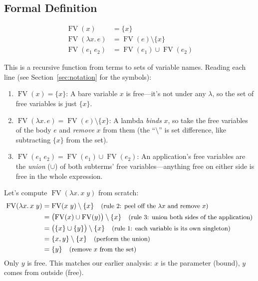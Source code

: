 \documentclass[11pt,a4paper]{article}
\theoremstyle{definition}
\newcommand{\lam}{\lambda}
\newcommand{\FV}{\operatorname{FV}}
\newcommand{\rmark}[1]{\quad\text{\small(#1)}}
\begin{document}
\subsection{Formal Definition}

\begin{defnbox}
\vspace{-0.8em}
\begin{align*}
\FV(x)           &= \{x\} \\
\FV(\lam x.\, e) &= \FV(e) \setminus \{x\} \\
\FV(e_1\; e_2)   &= \FV(e_1) \cup \FV(e_2)
\end{align*}
\end{defnbox}

\begin{intuition}
This is a recursive function from terms to sets of variable names. Reading each
line (see Section~\ref{sec:notation} for the symbols):
\begin{enumerate}[leftmargin=2em]
\item $\FV(x) = \{x\}$: A bare variable $x$ is free---it's not under any
  $\lam$, so the set of free variables is just $\{x\}$.
\item $\FV(\lam x.\, e) = \FV(e) \setminus \{x\}$: A lambda \emph{binds} $x$,
  so take the free variables of the body $e$ and \emph{remove} $x$ from them
  (the ``$\setminus$'' is set difference, like subtracting $\{x\}$ from the set).
\item $\FV(e_1\; e_2) = \FV(e_1) \cup \FV(e_2)$: An application's free
  variables are the \emph{union} ($\cup$) of both subterms' free variables---anything free on either side is free in the whole expression.
\end{enumerate}
\end{intuition}

\begin{workedexample}[Computing $\FV$ step by step]
Let's compute $\FV(\lam x.\, x\; y)$ from scratch:
\begin{align*}
  \FV(\lam x.\, x\; y)
  &= \FV(x\; y) \setminus \{x\}
    \rmark{rule 2: peel off the $\lam x$ and remove $x$} \\
  &= \bigl(\FV(x) \cup \FV(y)\bigr) \setminus \{x\}
    \rmark{rule 3: union both sides of the application} \\
  &= \bigl(\{x\} \cup \{y\}\bigr) \setminus \{x\}
    \rmark{rule 1: each variable is its own singleton} \\
  &= \{x, y\} \setminus \{x\}
    \rmark{perform the union} \\
  &= \{y\}
    \rmark{remove $x$ from the set}
\end{align*}
Only $y$ is free. This matches our earlier analysis: $x$ is the parameter
(bound), $y$ comes from outside (free).
\end{workedexample}
\end{document}

